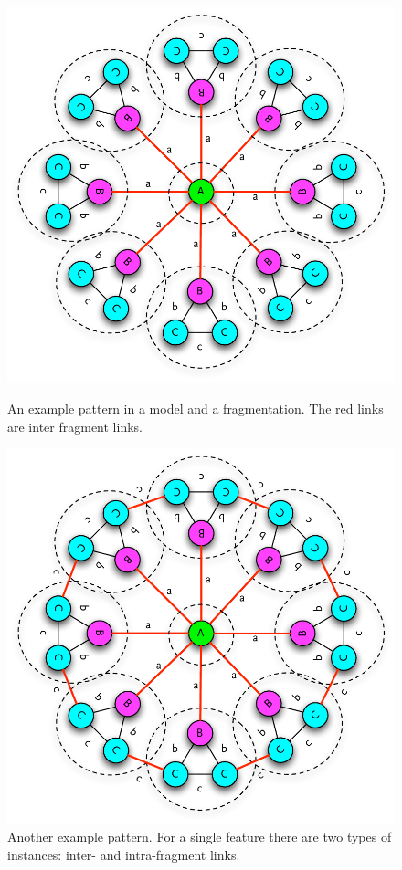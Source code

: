 \begin{figure}[ht]
\begin{minipage}[b]{0.5\linewidth}
\centering
\includegraphics[width=\linewidth]{figures/metamodel_fragmentation_patterns_tree}
\caption{An example pattern in a model and a fragmentation. The red links are inter fragment links.}
\label{fig:metamodel_fragmentation_pattern_tree}
\end{minipage}
\hspace{0.5cm}
\begin{minipage}[b]{0.5\linewidth}
\centering
\includegraphics[width=\linewidth]{figures/metamodel_fragmentation_patterns_graph}
\caption{Another example pattern. For a single feature there are two types of instances: inter- and intra-fragment links.}
\label{fig:metamodel_fragmentation_pattern_graph}
\end{minipage}
\end{figure}  

